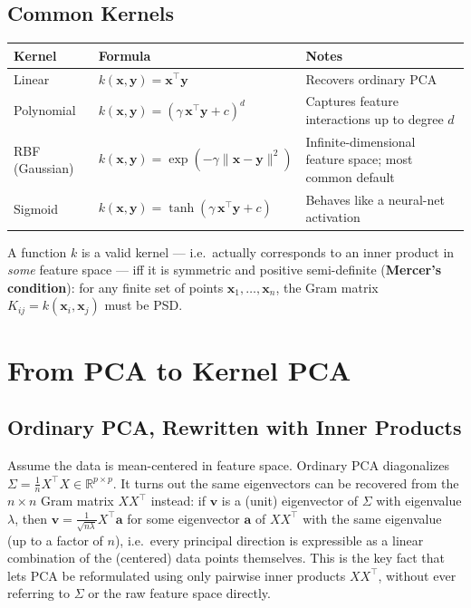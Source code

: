 \documentclass[11pt]{article}
\begin{document}
\subsection{Common Kernels}

\begin{center}
\begin{tabular}{lll}
  \toprule
  Kernel & Formula & Notes \\
  \midrule
  Linear & $k(\mathbf{x}, \mathbf{y}) = \mathbf{x}^\top \mathbf{y}$ & Recovers ordinary PCA \\
  Polynomial & $k(\mathbf{x}, \mathbf{y}) = (\gamma \, \mathbf{x}^\top \mathbf{y} + c)^d$ & Captures feature interactions up to degree $d$ \\
  RBF (Gaussian) & $k(\mathbf{x}, \mathbf{y}) = \exp(-\gamma \lVert \mathbf{x} - \mathbf{y} \rVert^2)$ & Infinite-dimensional feature space; most common default \\
  Sigmoid & $k(\mathbf{x}, \mathbf{y}) = \tanh(\gamma \, \mathbf{x}^\top \mathbf{y} + c)$ & Behaves like a neural-net activation \\
  \bottomrule
\end{tabular}
\end{center}

A function $k$ is a valid kernel --- i.e.\ actually corresponds to an inner
product in \emph{some} feature space --- iff it is symmetric and positive
semi-definite (\textbf{Mercer's condition}): for any finite set of points
$\mathbf{x}_1, \dots, \mathbf{x}_n$, the Gram matrix $K_{ij} = k(\mathbf{x}_i,
\mathbf{x}_j)$ must be PSD.

\section{From PCA to Kernel PCA}

\subsection{Ordinary PCA, Rewritten with Inner Products}

Assume the data is mean-centered in feature space. Ordinary PCA
diagonalizes $\Sigma = \frac{1}{n} X^\top X \in \mathbb{R}^{p \times p}$. It
turns out the same eigenvectors can be recovered from the
$n \times n$ Gram matrix $XX^\top$ instead: if $\mathbf{v}$ is a
(unit) eigenvector of $\Sigma$ with eigenvalue $\lambda$, then
$\mathbf{v} = \frac{1}{\sqrt{n\lambda}} X^\top \mathbf{a}$ for some
eigenvector $\mathbf{a}$ of $XX^\top$ with the same eigenvalue (up to a
factor of $n$), i.e.\ every principal direction is expressible as a linear
combination of the (centered) data points themselves. This is the key fact
that lets PCA be reformulated using only pairwise inner products
$X X^\top$, without ever referring to $\Sigma$ or the raw feature space
directly.
\end{document}
